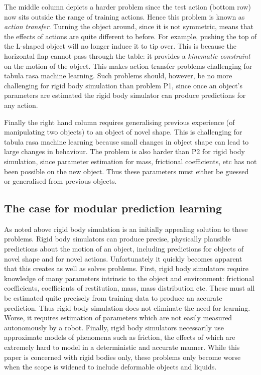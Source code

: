  The middle column depicts a harder problem since the test action (bottom row) now sits outside the range of training actions. Hence this problem is known as {\em action transfer}. Turning the object around, since it is not symmetric, means that the effects of actions are quite different to before. For example, pushing the top of the L-shaped object will no longer induce it to tip over. This is because the horizontal flap cannot pass through the table: it provides a {\em kinematic constraint} on the motion of the object. This makes action transfer problems challenging for tabula rasa machine learning. Such problems should, however, be no more challenging for rigid body simulation than problem P1, since once an object's parameters are estimated the rigid body simulator can produce predictions for any action.

 Finally the right hand column requires generalising previous experience (of manipulating two objects) to an object of novel shape. This is challenging for tabula rasa machine learning because small changes in object shape can lead to large changes in behaviour. The problem is also harder than P2 for rigid body simulation, since parameter estimation for mass, frictional coefficients, etc has not been possible on the new object. Thus these parameters must either be guessed or generalised from previous objects.

\subsection{The case for modular prediction learning}

As noted above rigid body simulation is an initially appealing solution to these problems. Rigid body simulators can produce precise, physically plausible predictions about the motion of an object, including predictions for objects of novel shape and for novel actions. Unfortunately it quickly becomes apparent that this creates as well as solves problems. First, rigid body simulators require knowledge of many parameters intrinsic to the object and environment: frictional coefficients, coefficients of restitution, mass, mass distribution etc. These must all be estimated quite precisely from training data to produce an accurate prediction. Thus rigid body simulation does not eliminate the need for learning. Worse, it requires estimation of parameters which are not easily measured autonomously by a robot. Finally, rigid body simulators necessarily use approximate models of phenomena such as friction, the effects of which are extremely hard to model in a deterministic and accurate manner. While this paper is concerned with rigid bodies only, these problems only become worse when the scope is widened to include deformable objects and liquids.

